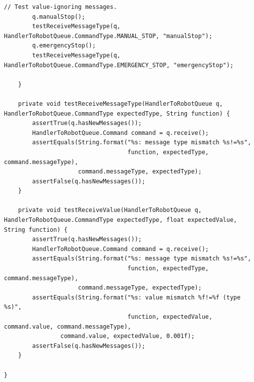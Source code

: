 \documentclass[12pt,a4paper]{article}
\begin{document}
\begin{lstlisting}[caption=HandlerToRobotQueue automated test suite, captionpos=b, label={lst:HandlerToRobotQueueAutomatedTestSuite}]
        // Test value-ignoring messages.
        q.manualStop();
        testReceiveMessageType(q, HandlerToRobotQueue.CommandType.MANUAL_STOP, "manualStop");
        q.emergencyStop();
        testReceiveMessageType(q, HandlerToRobotQueue.CommandType.EMERGENCY_STOP, "emergencyStop");
        
    }
   
    private void testReceiveMessageType(HandlerToRobotQueue q, HandlerToRobotQueue.CommandType expectedType, String function) {
        assertTrue(q.hasNewMessages());
        HandlerToRobotQueue.Command command = q.receive();
        assertEquals(String.format("%s: message type mismatch %s!=%s",
                                   function, expectedType, command.messageType),
                     command.messageType, expectedType);
        assertFalse(q.hasNewMessages());
    }
    
    private void testReceiveValue(HandlerToRobotQueue q, HandlerToRobotQueue.CommandType expectedType, float expectedValue, String function) {
        assertTrue(q.hasNewMessages());
        HandlerToRobotQueue.Command command = q.receive();
        assertEquals(String.format("%s: message type mismatch %s!=%s",
                                   function, expectedType, command.messageType),
                     command.messageType, expectedType);
        assertEquals(String.format("%s: value mismatch %f!=%f (type %s)",
                                   function, expectedValue, command.value, command.messageType),
                command.value, expectedValue, 0.001f);
        assertFalse(q.hasNewMessages());
    }

}

    \end{lstlisting}
    
\end{document}
